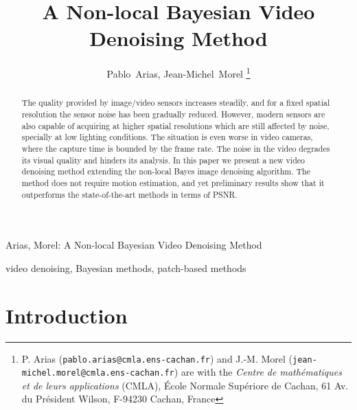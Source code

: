 \documentclass[10pt, journal, twocolumn, final, a4paper]{IEEEtran}
\begin{document}
\title{A Non-local Bayesian Video Denoising Method}

\author{Pablo~Arias, Jean-Michel~Morel%
\thanks{P. Arias (\texttt{pablo.arias@cmla.ens-cachan.fr}) and J.-M. Morel
(\texttt{jean-michel.morel@cmla.ens-cachan.fr}) are with the \emph{Centre de
math\'ematiques et de leurs applications} (CMLA), \'Ecole Normale Sup\'eriore
de Cachan, 61 Av. du Pr\'esident Wilson, F-94230 Cachan, France}}

%
{Arias, Morel: A Non-local Bayesian Video Denoising Method}


\maketitle              %

\begin{abstract}
	The quality provided by image/video sensors increases steadily, and
	for a fixed spatial resolution the sensor noise has been gradually reduced.
	However, modern sensors are also capable of acquiring at higher spatial
	resolutions which are still affected by noise, specially at low lighting
	conditions. The situation is even worse in video cameras, where the capture
	time is bounded by the frame rate. The noise in the video degrades its visual 
	quality and hinders its analysis.
	In this paper we present a new video denoising method extending 
	the non-local Bayes image denoising algorithm. The method does not require 
	motion estimation, and yet preliminary results show that it outperforms the
	state-of-the-art methods in terms of PSNR.
\end{abstract}

\begin{IEEEkeywords}
	video denoising, Bayesian methods, patch-based methods
\end{IEEEkeywords}


%
\IEEEpeerreviewmaketitle

%
\section{Introduction}
%
\end{document}
